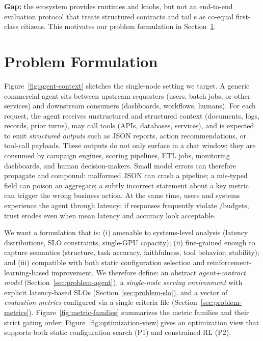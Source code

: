 \textbf{Gap:} the ecosystem provides runtimes and knobs, but not an end-to-end evaluation protocol that treats structured contracts and tail \slo s as co-equal first-class citizens.
This motivates our problem formulation in Section~\ref{sec:problem}.

\section{Problem Formulation}
\label{sec:problem}

Figure~\ref{fig:agent-context} sketches the single-node setting we target.
A generic commercial agent sits between upstream requesters (users, batch jobs, or other services) and downstream consumers (dashboards, workflows, humans).
For each request, the agent receives unstructured and structured context (documents, logs, records, prior turns), may call tools (APIs, databases, services), and is expected to emit \emph{structured outputs} such as JSON reports, action recommendations, or tool-call payloads.
These outputs do not only surface in a chat window; they are consumed by campaign engines, scoring pipelines, ETL jobs, monitoring dashboards, and human decision-makers.
Small model errors can therefore propagate and compound:
malformed JSON can crash a pipeline;
a mis-typed field can poison an aggregate;
a subtly incorrect statement about a key metric can trigger the wrong business action.
At the same time, users and systems experience the agent through latency: if responses frequently violate \pninetyfive/\pninetynine budgets, trust erodes even when mean latency and accuracy look acceptable.

We want a formulation that is:
(i) amenable to systems-level analysis (latency distributions, SLO constraints, single-GPU capacity);
(ii) fine-grained enough to capture semantics (structure, task accuracy, faithfulness, tool behavior, stability);
and (iii) compatible with both static configuration selection and reinforcement-learning-based improvement.
We therefore define:
an abstract \emph{agent+contract model} (Section~\ref{sec:problem-agent}),
a \emph{single-node serving environment} with explicit latency-based SLOs (Section~\ref{sec:problem-slo}),
and a vector of \emph{evaluation metrics} configured via a single criteria file (Section~\ref{sec:problem-metrics}).
Figure~\ref{fig:metric-families} summarizes the metric families and their strict gating order; Figure~\ref{fig:optimization-view} gives an optimization view that supports both static configuration search (P1) and constrained RL (P2).

